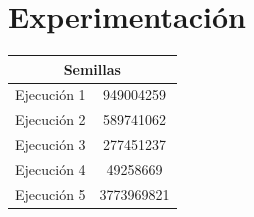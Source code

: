 \section{Experimentación}




\vspace*{\fill}

\begin{center}
    \begin{tabular}{|| c | c ||} 
        \hline
        \multicolumn{2}{|c|}{\textbf{Semillas}} \\
        \hline
        Ejecución 1 & 949004259 \\
        \hline
        Ejecución 2 & 589741062 \\
        \hline
        Ejecución 3 & 277451237 \\
        \hline
        Ejecución 4 & 49258669 \\
        \hline
        Ejecución 5 & 3773969821 \\
        \hline
    \end{tabular}
\end{center}

